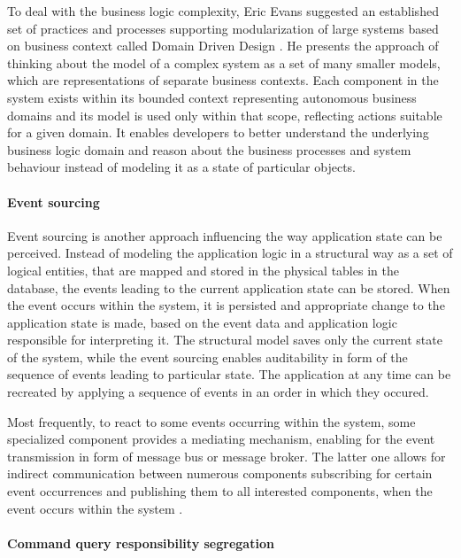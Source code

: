 To deal with the business logic complexity, Eric Evans suggested an established set of practices and processes supporting modularization of large systems based on business context called Domain Driven Design \cite{EvansDDD}. He presents the approach of thinking about the model of a complex system as a set of many smaller models, which are representations of separate business contexts. Each component in the system exists within its bounded context representing autonomous business domains and its model is used only within that scope, reflecting actions suitable for a given domain. It enables developers to better understand the underlying business logic domain and reason about the business processes and system behaviour instead of modeling it as a state of particular objects.

\paragraph{Event sourcing} \label{chapter:event-driven-sourcing}

Event sourcing is another approach influencing the way application state can be perceived. Instead of modeling the application logic in a structural way as a set of logical entities, that are mapped and stored in the physical tables in the database, the events leading to the current application state can be stored. When the event occurs within the system, it is persisted and appropriate change to the application state is made, based on the event data and application logic responsible for interpreting it. The structural model saves only the current state of the system, while the event sourcing enables auditability in form of the sequence of events leading to particular state. The application at any time can be recreated by applying a sequence of events in an order in which they occured.

Most frequently, to react to some events occurring within the system, some specialized component provides a mediating mechanism, enabling for the event transmission in form of message bus or message broker. The latter one allows for indirect communication between numerous components subscribing for certain event occurrences and publishing them to all interested components, when the event occurs within the system \cite{MicroservicesArchitecture}.

\paragraph{Command query responsibility segregation}

